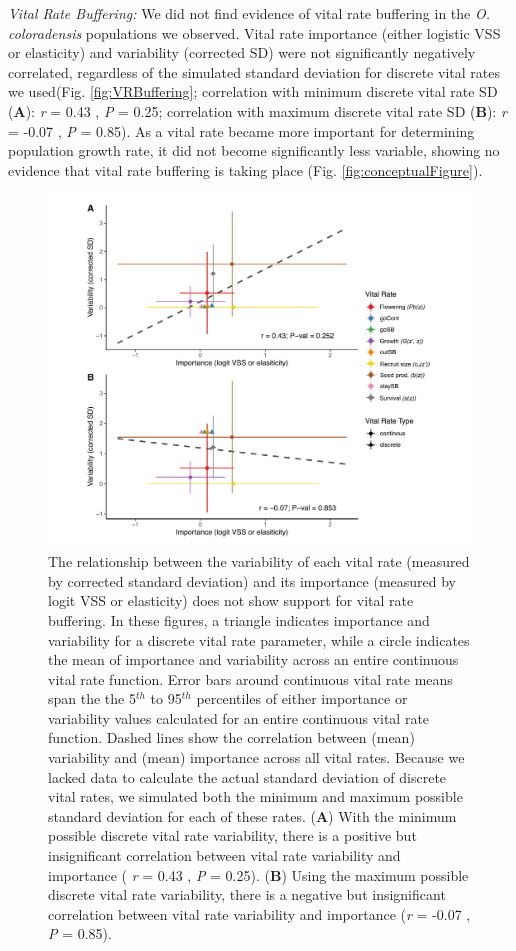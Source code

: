 \documentclass[12pt, letterpaper]{article}
\begin{document}
\textit{Vital Rate Buffering:} We did not find evidence of vital rate buffering in the \textit{O. coloradensis} populations we observed. Vital rate importance (either logistic VSS or elasticity) and variability (corrected SD) were not significantly negatively correlated, regardless of the simulated standard deviation for discrete vital rates we used(Fig. \ref{fig:VRBuffering}; correlation with minimum discrete vital rate SD (\textbf{A}): \textit{r} = 0.43 , \textit{P} = 0.25; correlation with maximum discrete vital rate SD (\textbf{B}): \textit{r} = -0.07 , \textit{P} = 0.85). As a vital rate became more important for determining population growth rate, it did not become significantly less variable, showing no evidence that vital rate buffering is taking place (Fig. \ref{fig:conceptualFigure}).  

\begin{figure}[h!]
  \centering
  \includegraphics[width=.9\textwidth]{figures/VRbufferingFigure.pdf}
  \caption{ \internallinenumbers The relationship between the variability of each vital rate (measured by corrected standard deviation) and its importance (measured by logit VSS or elasticity) does not show support for vital rate buffering. In these figures, a triangle indicates importance and variability for a discrete vital rate parameter, while a circle indicates the mean of importance and variability across an entire continuous vital rate function. Error bars around continuous vital rate means span the the 5$^{th}$ to 95$^{th}$ percentiles of either importance or variability values calculated for an entire continuous vital rate function. Dashed lines show the correlation between (mean) variability and (mean) importance across all vital rates. Because we lacked data to calculate the actual standard deviation of discrete vital rates, we simulated both the minimum and maximum possible standard deviation for each of these rates. (\textbf{A}) With the minimum possible discrete vital rate variability, there is a positive but insignificant correlation between vital rate variability and importance ( \textit{r} = 0.43 , \textit{P} = 0.25). (\textbf{B}) Using the maximum possible discrete vital rate variability, there is a negative but insignificant correlation between vital rate variability and importance (\textit{r} = -0.07 , \textit{P} = 0.85).}

\end{figure}
\end{document}
